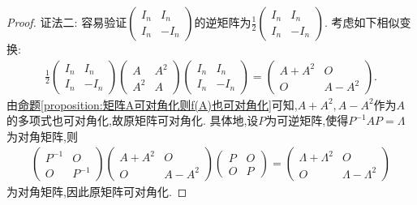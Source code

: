 \documentclass[../../main.tex]{subfiles}
\begin{document}
\begin{proof}
{\color{blue}证法二:}
容易验证$\begin{pmatrix}I_n&I_n\\I_n&-I_n\end{pmatrix}$的逆矩阵为$\frac{1}{2}\begin{pmatrix}I_n&I_n\\I_n&-I_n\end{pmatrix}$. 考虑如下相似变换:
\begin{align*}
\frac{1}{2}\begin{pmatrix}I_n&I_n\\I_n&-I_n\end{pmatrix}\begin{pmatrix}A&A^2\\A^2&A\end{pmatrix}\begin{pmatrix}I_n&I_n\\I_n&-I_n\end{pmatrix}=\begin{pmatrix}A + A^2&O\\O&A - A^2\end{pmatrix}.
\end{align*}
由\hyperref[proposition:矩阵A可对角化则f(A)也可对角化]{命题\ref{proposition:矩阵A可对角化则f(A)也可对角化}}可知,$A + A^2,A - A^2$作为$A$的多项式也可对角化,故原矩阵可对角化. 具体地,设$P$为可逆矩阵,使得$P^{-1}AP=\Lambda$为对角矩阵,则
\begin{align*}
\begin{pmatrix}P^{-1}&O\\O&P^{-1}\end{pmatrix}\begin{pmatrix}A + A^2&O\\O&A - A^2\end{pmatrix}\begin{pmatrix}P&O\\O&P\end{pmatrix}=\begin{pmatrix}\Lambda+\Lambda^2&O\\O&\Lambda - \Lambda^2\end{pmatrix}
\end{align*}
为对角矩阵,因此原矩阵可对角化.
\end{proof}
\end{document}
